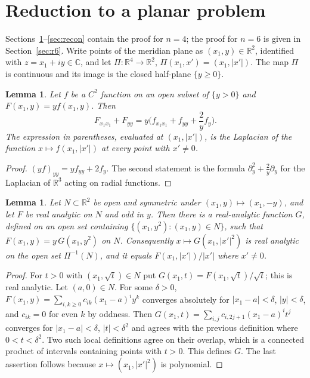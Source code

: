 \documentclass[11pt]{amsart}
\newtheorem{lemma}[theorem]{Lemma}
\theoremstyle{definition}
\theoremstyle{remark}
\numberwithin{equation}{section}
\newcommand{\R}{\mathbb{R}}
\newcommand{\C}{\mathbb{C}}
\begin{document}
\section{Reduction to a planar problem}\label{sec:reduction}

Sections~\ref{sec:reduction}--\ref{sec:recon} contain the proof for $n=4$; the proof for $n=6$ is given in Section~\ref{sec:r6}. Write points of the meridian plane as $(x_1,y)\in\R^2$, identified with $z=x_1+iy\in\C$, and let $\Pi\colon\R^4\to\R^2$, $\Pi(x_1,x')=(x_1,|x'|)$. The map $\Pi$ is continuous and its image is the closed half-plane $\{y\geq0\}$.

\begin{lemma}\label{lem:laplace-identity}
Let $f$ be a $C^2$ function on an open subset of $\{y>0\}$ and $F(x_1,y)=yf(x_1,y)$. Then
\[
F_{x_1x_1}+F_{yy}=y\Big(f_{x_1x_1}+f_{yy}+\frac2yf_y\Big).
\]
The expression in parentheses, evaluated at $(x_1,|x'|)$, is the Laplacian of the function $x\mapsto f(x_1,|x'|)$ at every point with $x'\neq0$.
\end{lemma}

\begin{proof}
$(yf)_{yy}=yf_{yy}+2f_y$. The second statement is the formula $\partial_y^2+\frac2y\partial_y$ for the Laplacian of $\R^3$ acting on radial functions.
\end{proof}

\begin{lemma}\label{lem:odd-division}
Let $N\subset\R^2$ be open and symmetric under $(x_1,y)\mapsto(x_1,-y)$, and let $F$ be real analytic on $N$ and odd in $y$. Then there is a real-analytic function $G$, defined on an open set containing $\{(x_1,y^2):(x_1,y)\in N\}$, such that $F(x_1,y)=y\,G(x_1,y^2)$ on $N$. Consequently $x\mapsto G(x_1,|x'|^2)$ is real analytic on the open set $\Pi^{-1}(N)$, and it equals $F(x_1,|x'|)/|x'|$ where $x'\neq0$.
\end{lemma}

\begin{proof}
For $t>0$ with $(x_1,\sqrt t)\in N$ put $G(x_1,t)=F(x_1,\sqrt t)/\sqrt t$; this is real analytic. Let $(a,0)\in N$. For some $\delta>0$, $F(x_1,y)=\sum_{i,k\geq0}c_{ik}(x_1-a)^iy^k$ converges absolutely for $|x_1-a|<\delta$, $|y|<\delta$, and $c_{ik}=0$ for even $k$ by oddness. Then $G(x_1,t)=\sum_{i,j}c_{i,2j+1}(x_1-a)^it^j$ converges for $|x_1-a|<\delta$, $|t|<\delta^2$ and agrees with the previous definition where $0<t<\delta^2$. Two such local definitions agree on their overlap, which is a connected product of intervals containing points with $t>0$. This defines $G$. The last assertion follows because $x\mapsto(x_1,|x'|^2)$ is polynomial.
\end{proof}
\end{document}
